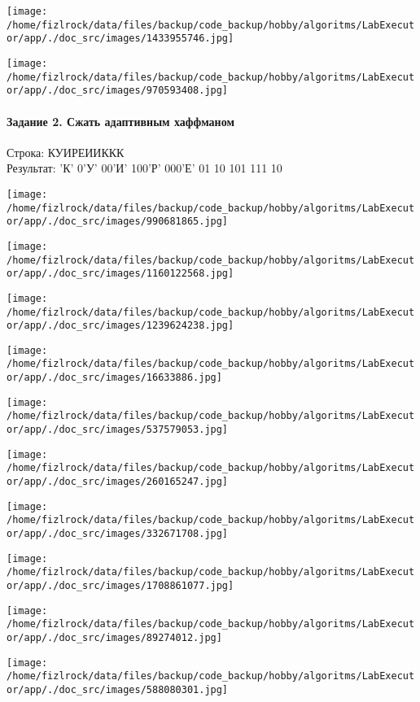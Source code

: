 \documentclass[a4paper, 12pt]{article}
\begin{document}
\texttt{[image: /home/fizlrock/data/files/backup/code\_backup/hobby/algoritms/LabExecutor/app/./doc\_src/images/1433955746.jpg]}

\texttt{[image: /home/fizlrock/data/files/backup/code\_backup/hobby/algoritms/LabExecutor/app/./doc\_src/images/970593408.jpg]}
\pagebreak
\paragraph{Задание 2. Сжать адаптивным хаффманом\\}

Строка: 
КУИРЕИИККК\\
Результат: 'К' 0'У' 00'И' 100'Р' 000'Е' 01 10 101 111 10

\texttt{[image: /home/fizlrock/data/files/backup/code\_backup/hobby/algoritms/LabExecutor/app/./doc\_src/images/990681865.jpg]}

\texttt{[image: /home/fizlrock/data/files/backup/code\_backup/hobby/algoritms/LabExecutor/app/./doc\_src/images/1160122568.jpg]}

\texttt{[image: /home/fizlrock/data/files/backup/code\_backup/hobby/algoritms/LabExecutor/app/./doc\_src/images/1239624238.jpg]}

\texttt{[image: /home/fizlrock/data/files/backup/code\_backup/hobby/algoritms/LabExecutor/app/./doc\_src/images/16633886.jpg]}

\texttt{[image: /home/fizlrock/data/files/backup/code\_backup/hobby/algoritms/LabExecutor/app/./doc\_src/images/537579053.jpg]}

\texttt{[image: /home/fizlrock/data/files/backup/code\_backup/hobby/algoritms/LabExecutor/app/./doc\_src/images/260165247.jpg]}

\texttt{[image: /home/fizlrock/data/files/backup/code\_backup/hobby/algoritms/LabExecutor/app/./doc\_src/images/332671708.jpg]}

\texttt{[image: /home/fizlrock/data/files/backup/code\_backup/hobby/algoritms/LabExecutor/app/./doc\_src/images/1708861077.jpg]}

\texttt{[image: /home/fizlrock/data/files/backup/code\_backup/hobby/algoritms/LabExecutor/app/./doc\_src/images/89274012.jpg]}

\texttt{[image: /home/fizlrock/data/files/backup/code\_backup/hobby/algoritms/LabExecutor/app/./doc\_src/images/588080301.jpg]}
\pagebreak
\end{document}
